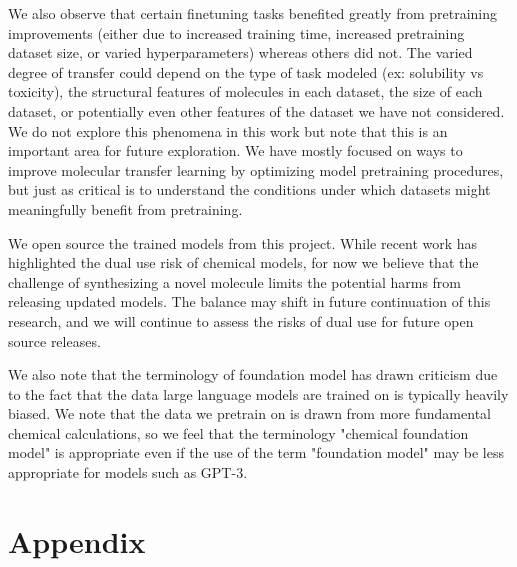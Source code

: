 \documentclass{article}
\begin{document}
We also observe that certain finetuning tasks benefited greatly from pretraining improvements (either due to increased training time, increased pretraining dataset size, or varied hyperparameters) whereas others did not. The varied degree of transfer could depend on the type of task modeled (ex: solubility vs toxicity), the structural features of molecules in each dataset, the size of each dataset, or potentially even other features of the dataset we have not considered. We do not explore this phenomena in this work but note that this is an important area for future exploration. We have mostly focused on ways to improve molecular transfer learning by optimizing model pretraining procedures, but just as critical is to understand the conditions under which datasets might meaningfully benefit from pretraining.

We open source the trained models from this project. While recent work has highlighted the dual use risk \cite{urbina2022dual} of chemical models, for now we believe that the challenge of synthesizing a novel molecule limits the potential harms from releasing updated models. The balance may shift in future continuation of this research, and we will continue to assess the risks of dual use for future open source releases.

We also note that the terminology of foundation model has drawn criticism due to the fact that the data large language models are trained on is typically heavily biased. We note that the data we pretrain on is drawn from more fundamental chemical calculations, so we feel that the terminology "chemical foundation model" is appropriate even if the use of the term "foundation model" may be less appropriate for models such as GPT-3.












\section{Appendix}
\end{document}
